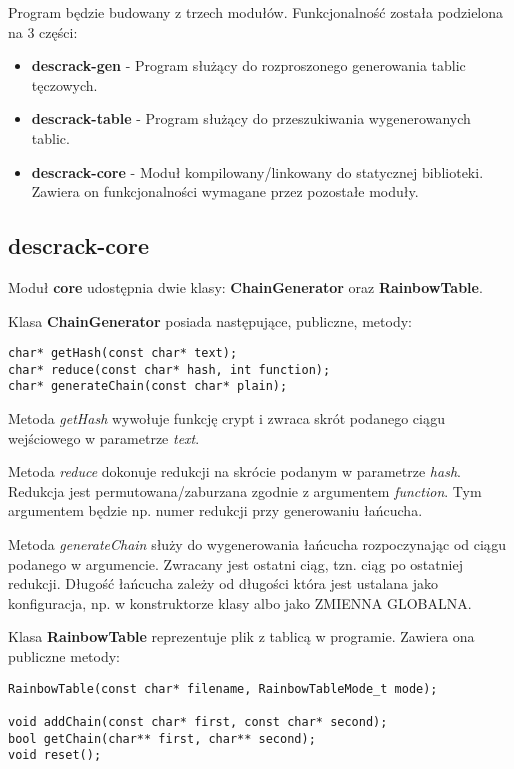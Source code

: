 \documentclass[a4paper,11pt]{article}
\begin{document}
Program będzie budowany z trzech modułów. Funkcjonalność została podzielona na 3 części:
\begin{itemize}
	\item \textbf{descrack-gen} - Program służący do rozproszonego generowania tablic tęczowych.
	\item \textbf{descrack-table} - Program służący do przeszukiwania wygenerowanych tablic.
	\item \textbf{descrack-core} - Moduł kompilowany/linkowany do statycznej biblioteki. Zawiera on funkcjonalności wymagane przez pozostałe moduły.
\end{itemize}

\subsection{descrack-core}

Moduł \textbf{core} udostępnia dwie klasy: \textbf{ChainGenerator} oraz \textbf{RainbowTable}. 

Klasa \textbf{ChainGenerator} posiada następujące, publiczne, metody:
\begin{lstlisting}
char* getHash(const char* text);
char* reduce(const char* hash, int function);
char* generateChain(const char* plain);
\end{lstlisting}

Metoda \emph{getHash} wywołuje funkcję crypt i zwraca skrót podanego ciągu wejściowego w parametrze \emph{text}.

Metoda \emph{reduce} dokonuje redukcji na skrócie podanym w parametrze \emph{hash}. Redukcja jest permutowana/zaburzana zgodnie z argumentem \emph{function}. Tym argumentem będzie np. numer redukcji przy generowaniu łańcucha.

Metoda \emph{generateChain} służy do wygenerowania łańcucha rozpoczynając od ciągu podanego w argumencie. Zwracany jest ostatni ciąg, tzn. ciąg po ostatniej redukcji. Długość łańcucha zależy od długości która jest ustalana jako konfiguracja, np. w konstruktorze klasy albo jako ZMIENNA GLOBALNA.

Klasa \textbf{RainbowTable} reprezentuje plik z tablicą w programie. Zawiera ona publiczne metody:

\begin{lstlisting}
RainbowTable(const char* filename, RainbowTableMode_t mode);

void addChain(const char* first, const char* second);
bool getChain(char** first, char** second);
void reset();
\end{lstlisting}
\end{document}
